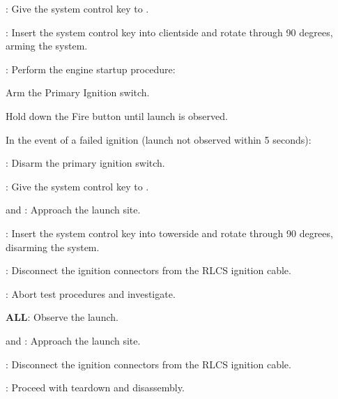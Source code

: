 \begin{checklist}
\begin{checklist}
    \item \control{}
  \end{checklist}
  \item \ops{}: Give the system control key to \control{}.
  \item \control{}: Insert the system control key into clientside and rotate through 90 degrees, arming the system.
  \item \control{}: Perform the engine startup procedure:
  \begin{checklist}
    \item Arm the Primary Ignition switch.
    \item Hold down the Fire button until launch is observed.
    \begin{checklist}[label=$\bullet$]
      \item In the event of a failed ignition (launch not observed within 5 seconds):
      \begin{checklist}
        \item \control{}: Disarm the primary ignition switch.
        \item \control{}: Give the system control key to \primary{}.
        \item \primary{} and \secondary{}: Approach the launch site. 
        \item \primary{}: Insert the system control key into towerside and rotate through 90 degrees, disarming the system.
        \item \primary{}: Disconnect the ignition connectors from the RLCS ignition cable. 
        \item \ops{}: Abort test procedures and investigate.
      \end{checklist}
    \end{checklist}
  \end{checklist}
  \item \textbf{ALL}: Observe the launch. 
  \item \primary{} and \secondary{}: Approach the launch site. 
  \item \primary{}: Disconnect the ignition connectors from the RLCS ignition cable. 
  \item \ops{}: Proceed with teardown and disassembly. 
\end{checklist}
\setcounter{checklistnum}{0}


  
